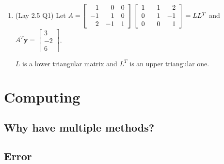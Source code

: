 \documentclass[12pt,letterpaper,noanswers]{exam}
\begin{document}
\begin{enumerate}[resume]
\item (Lay 2.5 Q1) Let $A = \left[\begin{array}{r r r}
1 & 0 & 0 \\
-1 & 1 & 0 \\
2 & -1 & 1
\end{array}\right]
\left[\begin{array}{r r r}
1 & -1 & 2 \\
0 & 1 & -1 \\
0 & 0 & 1
\end{array}\right] = LL^T$ and $A^T\mathbf{y} = \left[\begin{array}{r} 3 \\ -2\\ 6\end{array}\right]$. 

$L$ is a lower triangular matrix and $L^T$ is an upper triangular one.  
\end{enumerate}
\vspace{1in}



\section{Computing}

\subsection{Why have multiple methods?}

\subsection{Error}
\end{document}
